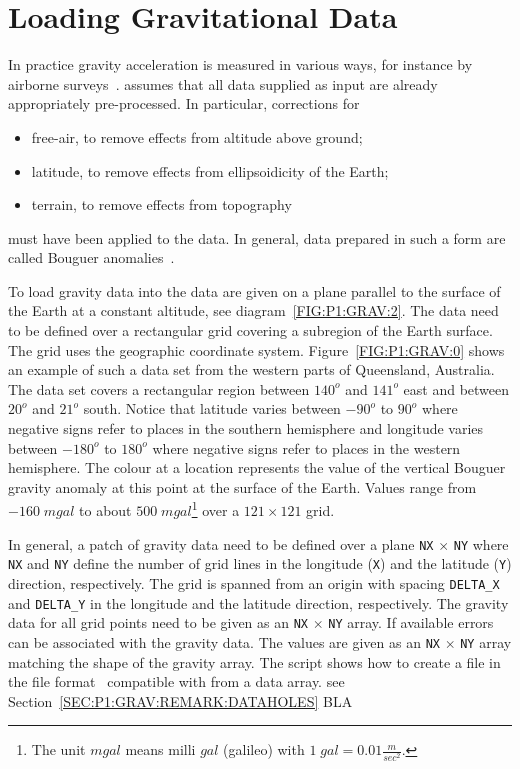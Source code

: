 \section{Loading Gravitational Data}\label{SEC:P1:GRAV:DATA}
In practice gravity acceleration is measured in various ways, for instance by
airborne surveys~\cite{Telford1990a}.
\downunder assumes that all data supplied as input are already appropriately
pre-processed. In particular, corrections for
\begin{itemize}
 \item free-air, to remove effects from altitude above ground;
 \item latitude, to remove effects from ellipsoidicity of the Earth;
 \item terrain, to remove effects from topography
\end{itemize}
must have been applied to the data.
In general, data prepared in such a form are called Bouguer anomalies~\cite{Telford1990a}.

To load gravity data into \downunder the data are given on a plane parallel
to the surface of the Earth at a constant altitude, see
diagram~\ref{FIG:P1:GRAV:2}.
The data need to be defined over a rectangular grid covering a subregion of
the Earth surface.
The grid uses the geographic coordinate system.
Figure~\ref{FIG:P1:GRAV:0} shows an example of such a data set from the
western parts of Queensland, Australia.
The data set covers a rectangular region between $140^o$ and $141^o$ east
and between $20^o$ and $21^o$ south.
Notice that latitude varies between $-90^o$ to $90^o$ where negative signs
refer to places in the southern hemisphere and longitude varies between
$-180^o$ to $180^o$ where negative signs refer to places in the western
hemisphere.
The colour at a location represents the value of the vertical Bouguer gravity
anomaly at this point at the surface of the Earth.
Values range from $-160 \; mgal$ to about $500 \; mgal$\footnote{The unit
$mgal$ means milli $gal$ (galileo) with $1 \; gal = 0.01 \frac{m}{sec^2}$.}
over a $121 \times 121$ grid.

In general, a patch of gravity data need to be defined over a plane
\verb|NX| $\times$ \verb|NY| where \verb|NX| and \verb|NY| define the number
of grid lines in the longitude (\verb|X|) and the latitude (\verb|Y|)
direction, respectively.
The grid is spanned from an origin with spacing \verb|DELTA_X| and
\verb|DELTA_Y| in the longitude and the latitude direction, respectively.
The gravity data for all grid points need to be given as an \verb|NX|
$\times$ \verb|NY| array.
If available errors can be associated with the gravity data.
The values are given as an \verb|NX| $\times$ \verb|NY| array matching the
shape of the gravity array.
The \Python script  shows how to create a file
in the \netcdf file format~\cite{NETCDF} compatible with \downunder from
a data array.
see Section~\ref{SEC:P1:GRAV:REMARK:DATAHOLES}
BLA 

